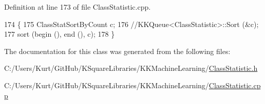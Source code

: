 Definition at line 173 of file Class\+Statistic.\+cpp.


\begin{DoxyCode}
174 \{
175   ClassStatSortByCount  c;
176   \textcolor{comment}{//KKQueue<ClassStatistic>::Sort (&c);}
177   sort (begin (), end (), c);
178 \}
\end{DoxyCode}


The documentation for this class was generated from the following files\+:\begin{DoxyCompactItemize}
\item 
C\+:/\+Users/\+Kurt/\+Git\+Hub/\+K\+Square\+Libraries/\+K\+K\+Machine\+Learning/\hyperlink{_class_statistic_8h}{Class\+Statistic.\+h}\item 
C\+:/\+Users/\+Kurt/\+Git\+Hub/\+K\+Square\+Libraries/\+K\+K\+Machine\+Learning/\hyperlink{_class_statistic_8cpp}{Class\+Statistic.\+cpp}\end{DoxyCompactItemize}
